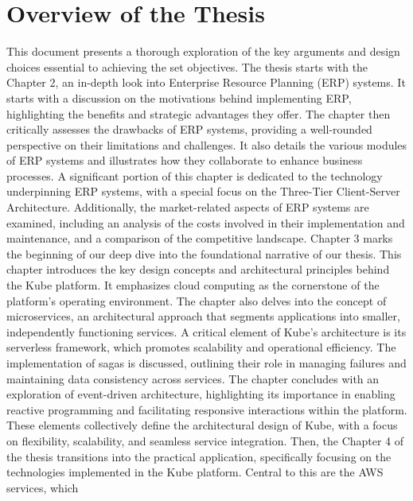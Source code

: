 \section{Overview of the Thesis}
This document presents a thorough exploration of the key arguments and design choices essential to
achieving the set objectives. The thesis starts with the Chapter 2, an in-depth look into Enterprise
Resource Planning (ERP) systems. It starts with a discussion on the motivations behind implementing
ERP, highlighting the benefits and strategic advantages they offer. The chapter then critically
assesses the drawbacks of ERP systems, providing a well-rounded perspective on their limitations and
challenges. It also details the various modules of ERP systems and illustrates how they collaborate
to enhance business processes. A significant portion of this chapter is dedicated to the technology
underpinning ERP systems, with a special focus on the Three-Tier Client-Server Architecture.
Additionally, the market-related aspects of ERP systems are examined, including an analysis of the
costs involved in their implementation and maintenance, and a comparison of the competitive
landscape.
\newline\newline
Chapter 3 marks the beginning of our deep dive into the foundational narrative of our thesis. This
chapter introduces the key design concepts and architectural principles behind the Kube platform. It
emphasizes cloud computing as the cornerstone of the platform's operating environment. The chapter
also delves into the concept of microservices, an architectural approach that segments applications
into smaller, independently functioning services. A critical element of Kube's architecture is its
serverless framework, which promotes scalability and operational efficiency. The implementation of
sagas is discussed, outlining their role in managing failures and maintaining data consistency
across services. The chapter concludes with an exploration of event-driven architecture,
highlighting its importance in enabling reactive programming and facilitating responsive
interactions within the platform. These elements collectively define the architectural design of
Kube, with a focus on flexibility, scalability, and seamless service integration.
\newline\newline
Then, the Chapter 4 of the thesis transitions into the practical application, specifically focusing
on the technologies implemented in the Kube platform. Central to this are the AWS services, which
